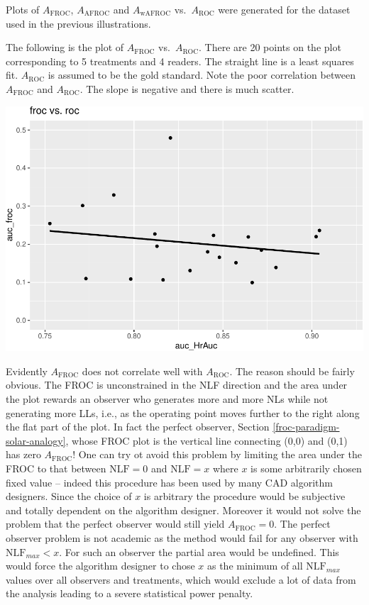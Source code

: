 \documentclass[
]{book}
\begin{document}
Plots of \(A_{\text{FROC}}\), \(A_{\text{AFROC}}\) and \(A_{\text{wAFROC}}\) vs.~\(A_{\text{ROC}}\) were generated for the dataset used in the previous illustrations.

The following is the plot of \(A_{\text{FROC}}\) vs.~\(A_{\text{ROC}}\). There are 20 points on the plot corresponding to 5 treatments and 4 readers. The straight line is a least squares fit. \(A_{\text{ROC}}\) is assumed to be the gold standard. Note the poor correlation between \(A_{\text{FROC}}\) and \(A_{\text{ROC}}\). The slope is negative and there is much scatter.

\includegraphics{13a-froc-empirical1_files/figure-latex/unnamed-chunk-19-1.pdf}

Evidently \(A_{\text{FROC}}\) does not correlate well with \(A_{\text{ROC}}\). The reason should be fairly obvious. The FROC is unconstrained in the NLF direction and the area under the plot rewards an observer who generates more and more NLs while not generating more LLs, i.e., as the operating point moves further to the right along the flat part of the plot. In fact the perfect observer, Section \ref{froc-paradigm-solar-analogy}, whose FROC plot is the vertical line connecting (0,0) and (0,1) has zero \(A_{\text{FROC}}\)! One can try ot avoid this problem by limiting the area under the FROC to that between \(\text{NLF} = 0\) and \(\text{NLF} = x\) where \(x\) is some arbitrarily chosen fixed value -- indeed this procedure has been used by many CAD algorithm designers. Since the choice of \(x\) is arbitrary the procedure would be subjective and totally dependent on the algorithm designer. Moreover it would not solve the problem that the perfect observer would still yield \(A_{\text{FROC}} = 0\). The perfect observer problem is not academic as the method would fail for any observer with \(\text{NLF}_{max} < x\). For such an observer the partial area would be undefined. This would force the algorithm designer to chose \(x\) as the minimum of all \(\text{NLF}_{max}\) values over all observers and treatments, which would exclude a lot of data from the analysis leading to a severe statistical power penalty.
\end{document}
